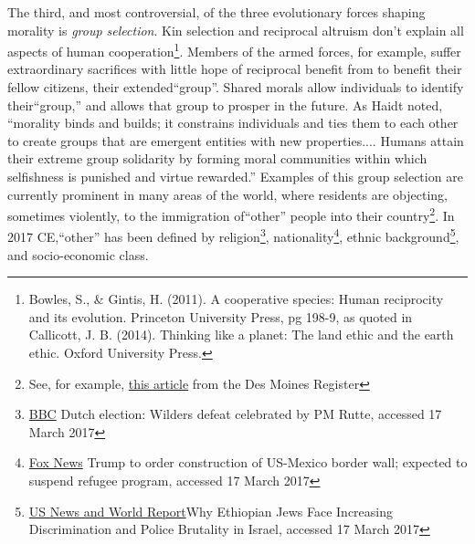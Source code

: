 \documentclass[amstex,12pt]{book}
\begin{document}
The third, and most controversial, of the three evolutionary forces shaping morality is \emph{group selection}. Kin selection and reciprocal altruism don't explain all aspects of human cooperation\footnote{Bowles, S., \& Gintis, H. (2011). A cooperative species: Human reciprocity and its evolution. Princeton University Press, pg 198-9, as quoted in Callicott, J. B. (2014). Thinking like a planet: The land ethic and the earth ethic. Oxford University Press.}. Members of the armed forces, for example, suffer extraordinary sacrifices with little hope of reciprocal benefit from to benefit their fellow citizens, their extended``group''. Shared morals allow individuals to identify their``group,'' and allows that group to prosper in the future. As Haidt noted, ``morality
binds and builds; it constrains individuals and ties them to each other to create groups that are emergent entities with new properties.... Humans attain their extreme group solidarity by forming moral communities within which selfishness is punished and virtue rewarded.'' Examples of this group selection are currently prominent in many areas of the world, where residents are objecting, sometimes violently, to the immigration of``other'' people into their country\footnote{See, for example, \href{http://www.desmoinesregister.com/story/news/politics/2017/03/13/iowa-gop-chair-jeff-kaufmann-condemns-steve-king-our-civilization-tweet/99116748/} {this article} from the Des Moines Register}. In 2017 CE,``other'' has been defined by religion\footnote{\href{http://www.bbc.com/news/world-europe-39287689}{BBC} Dutch election: Wilders defeat celebrated by PM Rutte, accessed 17 March 2017}, nationality\footnote{\href{http://www.foxnews.com/politics/2017/01/25/trump-to-order-construction-us-mexican-border-wall-reportedly-to-suspend-refugee-program.html}{Fox News} Trump to order construction of US-Mexico border wall; expected to suspend refugee program, accessed 17 March 2017}, ethnic background\footnote{\href{http://www.newsweek.com/2016/10/07/why-ethiopian-jews-israel-face-discrimination-racism-police-brutality-502697.html}{US News and World Report}Why Ethiopian Jews Face Increasing Discrimination and Police Brutality in Israel, accessed 17 March 2017}, and socio-economic class.
  
\end{document}
